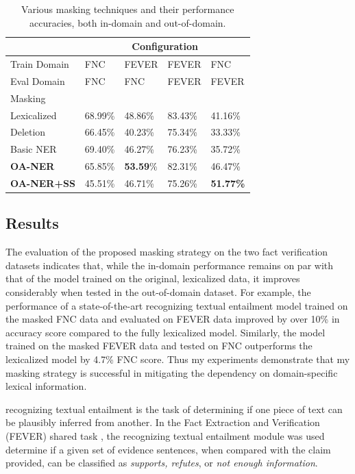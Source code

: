 \documentclass{article}
\begin{document}
\begin{table}[ht]
\begin{center}
\begin{tabular}{p{22mm}|p{9mm}p{9mm}p{9mm}p{9mm}}
 & \multicolumn{4}{c}{Configuration} \\
 \hline
Train Domain & {FNC}& {FEVER}  & {FEVER} & {{FNC}} \\ 
Eval Domain & {FNC}& {{FNC}}  & {FEVER} & {{FEVER}} \\ \hline
Masking & & & & \\
\hline
Lexicalized &68.99\%& {48.86\%} &83.43\%& {41.16\%} \\
Deletion  &66.45\%& 40.23\% &75.34\%& 33.33\% \\
Basic NER &69.40\%& 46.27\% &76.23\%& 35.72\%\\
\textbf{OA-NER} &65.85\%& \textbf{53.59}\% &{82.31\%}& {46.47\%}\\
\textbf{OA-NER+SS} & 45.51\%& 46.71\% &75.26\%& {\bf 51.77\%}\\
\end{tabular}
\end{center}
    \caption{\label{crossdomain} Various masking techniques and their performance accuracies, both in-domain and out-of-domain.} \label{tab:results}

\end{table}


\subsection{Results} 
\label{sec:results}
The evaluation of the proposed masking strategy on the two fact verification datasets indicates that,
while the in-domain performance remains on par with that of the model trained on the original, lexicalized data, it improves considerably when tested in the out-of-domain dataset. 
For example, the performance of a state-of-the-art recognizing textual entailment model trained on the masked FNC data and evaluated on FEVER data improved by over 10\% in accuracy score compared to the fully lexicalized model. Similarly, the model trained on the masked FEVER data and tested on FNC outperforms the lexicalized model by 4.7\% FNC score.
Thus my experiments demonstrate that my masking strategy is successful in mitigating the dependency on domain-specific lexical information.

recognizing textual entailment is the task of determining if one piece of text can be plausibly inferred from another. In the Fact Extraction and Verification (FEVER) shared task \citep*{thorne2018fever}, the recognizing textual entailment module was used determine if a given set of evidence sentences, when compared with the claim provided, can be classified as \textit{supports, refutes}, or \textit{not enough information}.
\end{document}
